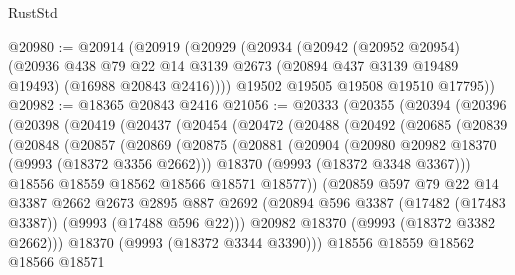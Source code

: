 \begin{lexlean}{RustStd}
\begin{coremodule}
@20980 := @20914
    (@20919
      (@20929
        (@20934
          (@20942
            (@20952 @20954)
            (@20936
              @438
              @79
              @22
              @14
              @3139
              @2673
              (@20894 @437 @3139 @19489 @19493)
              (@16988 @20843 @2416))))
        @19502
        @19505
        @19508
        @19510
        @17795))
@20982 := @18365 @20843 @2416
@21056 := @20333
    (@20355
      (@20394
        (@20396
          (@20398
            (@20419
              (@20437
                (@20454
                  (@20472
                    (@20488
                      (@20492
                        (@20685
                          (@20839
                            (@20848
                              (@20857
                                (@20869
                                  (@20875
                                    (@20881
                                      (@20904
                                        (@20980 @20982 @18370 (@9993 (@18372 @3356 @2662)))
                                        @18370
                                        (@9993 (@18372 @3348 @3367)))
                                      @18556
                                      @18559
                                      @18562
                                      @18566
                                      @18571
                                      @18577))
                                  (@20859
                                    @597
                                    @79
                                    @22
                                    @14
                                    @3387
                                    @2662
                                    @2673
                                    @2895
                                    @887
                                    @2692
                                    (@20894
                                      @596
                                      @3387
                                      (@17482 (@17483 @3387))
                                      (@9993 (@17488 @596 @22)))
                                    @20982
                                    @18370
                                    (@9993 (@18372 @3382 @2662)))
                                  @18370
                                  (@9993 (@18372 @3344 @3390)))
                                @18556
                                @18559
                                @18562
                                @18566
                                @18571

\end{coremodule}
\end{lexlean}

